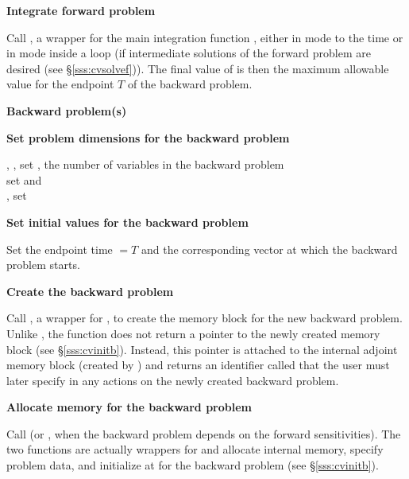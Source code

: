 \begin{Steps}
\item
  {\bf Integrate forward problem}

  Call , a wrapper for the {\cvodes} main integration
  function , either in  mode to the time 
   or in  mode inside a loop (if intermediate
  solutions of the forward problem are desired (see \S\ref{sss:cvsolvef})).
  The final value of  is then the maximum allowable value for the
  endpoint $T$ of the backward problem.

  \vspace{0.2in}\centerline{\bf Backward problem(s)}

 \item \label{i:back_start}
   {\bf Set problem dimensions for the backward problem}
   
   {\s, \omp, \pt} set , the number of variables in the backward problem \\
   {\p} set  and  \\
   {\omp, \pt} set 

\item
  {\bf Set initial values for the backward problem}

  Set the endpoint time  $= T$ and the corresponding vector 
  at which the backward problem starts.

\item
  {\bf Create the backward problem}

  Call , a wrapper for , to
  create the {\cvodes} memory block for the new backward problem. Unlike
  , the function  does not return a pointer to
  the newly created memory block (see \S\ref{sss:cvinitb}). Instead, this pointer
  is attached to the internal adjoint memory  block (created by )
  and returns an identifier called  that the user must later specify
  in any actions on the newly created backward problem.

\item
  {\bf Allocate memory for the backward problem}

  Call  (or , when the backward problem depends on the
  forward sensitivities). The two functions are actually wrappers for  
  and allocate internal memory, specify problem data, and initialize {\cvodes} 
  at  for the backward problem (see \S\ref{sss:cvinitb}).


\end{Steps}
